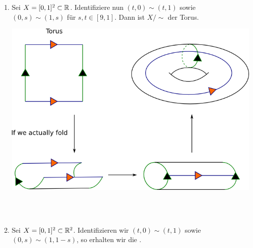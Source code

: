 \begin{example}
    \begin{enumerate}[1)]
        \item Sei $X = [0,1]^2 \subset \mathbb{R}$. Identifiziere nun $(t,0) \sim  (t,1)$ sowie $(0,s) \sim  (1,s)$ für $s,t\in [9,1]$. Dann ist $X / \sim $ der Torus.
        \begin{minipage}{\textwidth}
            \includegraphics[width=\textwidth]{figures/part1.png}
            \end{minipage} \\ \\
        \item Sei $X = [0,1] ^2 \subset \mathbb{R}^2$. Identifizieren wir $(t,0) \sim  (t,1)$ sowie $(0,s) \sim  (1, 1-s)$, so erhalten wir die . 
            \begin{minipage}{\textwidth}
                \begin{minipage}{0.3\textwidth}

\end{minipage}
\end{minipage}
\end{enumerate}
\end{example}
